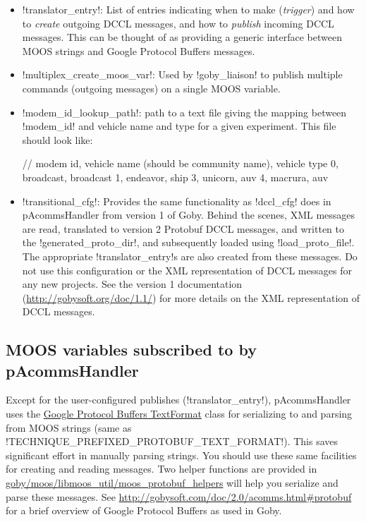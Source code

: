\begin{itemize}
\item !translator_entry!: List of entries indicating when to make (\textit{trigger}) and how to \textit{create} outgoing DCCL messages, and how to \textit{publish} incoming DCCL messages. This can be thought of as providing a generic interface between MOOS strings and Google Protocol Buffers messages.
\item !multiplex_create_moos_var!: Used by !goby_liaison! to publish multiple commands (outgoing messages) on a single MOOS variable.
\item !modem_id_lookup_path!: path to a text file giving the mapping between !modem_id! and vehicle name and type for a given experiment. This file should look like:
\begin{boxedverbatim}
// modem id, vehicle name (should be community name), vehicle type
0, broadcast, broadcast
1, endeavor, ship
3, unicorn, auv
4, macrura, auv
\end{boxedverbatim}
\resetbvlinenumber
\item !transitional_cfg!: Provides the same functionality as !dccl_cfg! does in pAcommsHandler from version 1 of Goby. Behind the scenes, XML messages are read, translated to version 2 Protobuf DCCL messages, and written to the !generated_proto_dir!, and subsequently loaded using !load_proto_file!. The appropriate !translator_entry!s are also created from these messages. Do not use this configuration or the XML representation of DCCL messages for any new projects. See the version 1 documentation (\url{http://gobysoft.org/doc/1.1/}) for more details on the XML representation of DCCL messages.
\end{itemize}

\subsection{MOOS variables subscribed to by pAcommsHandler}

Except for the user-configured publishes (!translator_entry!), pAcommsHandler uses the \href{http://code.google.com/apis/protocolbuffers/docs/reference/cpp/google.protobuf.text_format.html}{Google Protocol Buffers TextFormat} class for serializing to and parsing from MOOS strings (same as !TECHNIQUE_PREFIXED_PROTOBUF_TEXT_FORMAT!). This saves significant effort in manually parsing strings. You should use these same facilities for creating and reading messages. Two helper functions are provided in \\ \href{http://gobysoft.com/doc/moos__protobuf__helpers_8h.html}{goby/moos/libmoos\_util/moos\_protobuf\_helpers} will help you serialize and parse these messages. See \url{http://gobysoft.com/doc/2.0/acomms.html#protobuf} for a brief overview of Google Protocol Buffers as used in Goby.

